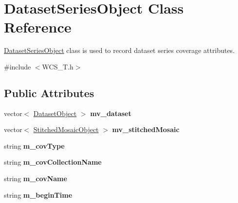 \hypertarget{classDatasetSeriesObject}{
\section{DatasetSeriesObject Class Reference}
\label{classDatasetSeriesObject}
}


\hyperlink{classDatasetSeriesObject}{DatasetSeriesObject} class is used to record dataset series coverage attributes.  




{\ttfamily \#include $<$WCS\_\-T.h$>$}

\subsection*{Public Attributes}
\begin{DoxyCompactItemize}
\item 
\hypertarget{classDatasetSeriesObject_a4b00e3d302f9817c57876bcee5ceacbf}{
vector$<$ \hyperlink{classDatasetObject}{DatasetObject} $>$ {\bfseries mv\_\-dataset}}
\label{classDatasetSeriesObject_a4b00e3d302f9817c57876bcee5ceacbf}

\item 
\hypertarget{classDatasetSeriesObject_a125cb0cbc5d6225707eaefc782da5c51}{
vector$<$ \hyperlink{classStitchedMosaicObject}{StitchedMosaicObject} $>$ {\bfseries mv\_\-stitchedMosaic}}
\label{classDatasetSeriesObject_a125cb0cbc5d6225707eaefc782da5c51}

\item 
\hypertarget{classDatasetSeriesObject_ad59c7806f24a16e34c2ab4f588f01138}{
string {\bfseries m\_\-covType}}
\label{classDatasetSeriesObject_ad59c7806f24a16e34c2ab4f588f01138}

\item 
\hypertarget{classDatasetSeriesObject_a4d57c2ccfd9ab827fb66ddcb4689f136}{
string {\bfseries m\_\-covCollectionName}}
\label{classDatasetSeriesObject_a4d57c2ccfd9ab827fb66ddcb4689f136}

\item 
\hypertarget{classDatasetSeriesObject_a60418feb416390fc2379b9f0553dc1d0}{
string {\bfseries m\_\-covName}}
\label{classDatasetSeriesObject_a60418feb416390fc2379b9f0553dc1d0}

\item 
\hypertarget{classDatasetSeriesObject_ad5e785e82c319b758578f44c52be0723}{
string {\bfseries m\_\-beginTime}}
\label{classDatasetSeriesObject_ad5e785e82c319b758578f44c52be0723}


\end{DoxyCompactItemize}
